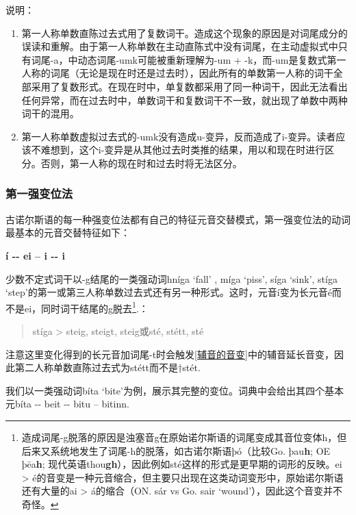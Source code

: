 说明：

\begin{enumerate}
\def\labelenumi{\arabic{enumi})}
\item
  \label{_Ref117719619}{}第一人称单数直陈过去式用了复数词干。造成这个现象的原因是对词尾成分的误读和重解。由于第一人称单数在主动直陈式中没有词尾，在主动虚拟式中只有词尾-a，中动态词尾-umk可能被重新理解为-um
  +
  -k，而-um是复数式第一人称的词尾（无论是现在时还是过去时），因此所有的单数第一人称的词干全部采用了复数形式。在现在时中，单复数都采用了同一种词干，因此无法看出任何异常，而在过去时中，单数词干和复数词干不一致，就出现了单数中两种词干的混用。
\item
  第一人称单数虚拟过去式的-umk没有造成u-变异，反而造成了i-变异。读者应该不难想到，这个i-变异是从其他过去时类推的结果，用以和现在时进行区分。否则，第一人称的现在时和过去时将无法区分。
\end{enumerate}

\subsubsection{第一强变位法}\label{第一强变位法}

古诺尔斯语的每一种强变位法都有自己的特征元音交替模式，第一强变位法的动词最基本的元音交替特征如下：

\textbf{í -\/- ei -- i -\/- i}

少数不定式词干以-g结尾的一类强动词hníga `fall' , míga `piss', síga
`sink', stíga
`step'的第一或第三人称单数过去式还有另一种形式。这时，元音í变为长元音é而不是ei，同时词干结尾的g脱去\footnote{造成词尾-g脱落的原因是浊塞音g在原始诺尔斯语的词尾变成其音位变体h，但后来又系统地发生了词尾-h的脱落，如古诺尔斯语þó（比较Go.
  þau\textbf{h}; OE þēa\textbf{h};
  现代英语thou\textbf{gh}），因此例如sté这样的形式是更早期的词形的反映。ei
  \textgreater{}
  é的音变是一种元音缩合，但主要只出现在这类动词变形中，原始诺尔斯语还有大量的ai
  \textgreater{} á的缩合（ON. sár vs Go. sair
  `wound'），因此这个音变并不奇怪。}.：

\begin{quote}
stíga \textgreater{} steig, steigt, steig或sté, stétt, sté
\end{quote}

注意这里变化得到的长元音加词尾-t时会触发\ref{辅音的音变}中的辅音延长音变，因此第二人称单数直陈过去式为stétt而不是†stét.

我们以一类强动词bíta
`bite'为例，展示其完整的变位。词典中会给出其四个基本元bíta -\/- beit
-\/- bitu -- bitinn.

